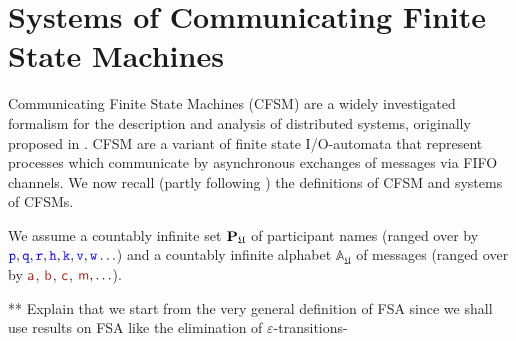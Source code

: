 \section{Systems of Communicating Finite State Machines}
\label{sect:cfsm}

Communicating Finite State Machines (CFSM)   are 
 a widely investigated
formalism for the description and analysis of distributed systems, originally proposed in \cite{BZ83}.
CFSM are a variant of finite state I/O-automata that represent processes which communicate by asynchronous exchanges of messages via FIFO channels. 
We now recall (partly following \cite{CF05,DY12,TY15,BdLH19}) the definitions of CFSM and systems of CFSMs.

We assume %
a countably infinite set  
$\mathbf{P}_\mathfrak{U}$ of participant names (ranged over by ${\mathtt{\color{blue}{ {p}}}},{\mathtt{\color{blue}{ {q}}}},{\mathtt{\color{blue}{ {r}}}},{\mathtt{\color{blue}{ {h}}}},{\mathtt{\color{blue}{ {k}}}},{\mathtt{\color{blue}{ {v}}}},{\mathtt{\color{blue}{ {w}}}}\ldots$) and a countably infinite alphabet $\mathbb{A}_\mathfrak{U}$ 
of messages (ranged over by $\msg[a]$, $\msg[b]$, $\msg[c]$, $\msg[m],\ldots$).\\

\begin{definition}
 
\end{definition}
** Explain that we start from the very general definition of FSA since we shall use results on FSA like
the elimination of $\varepsilon$-transitions-

